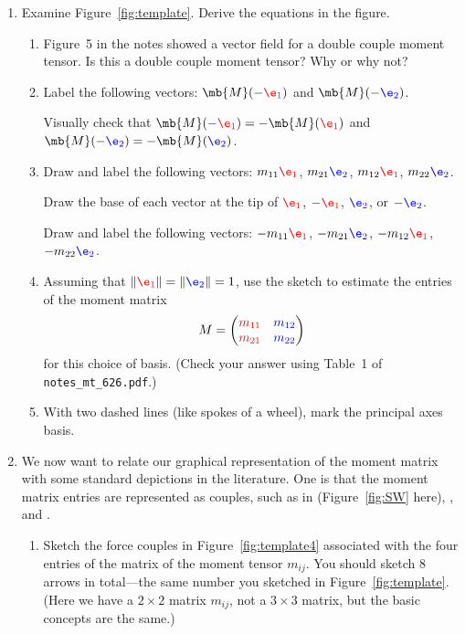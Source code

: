 \documentclass[11pt,titlepage,fleqn]{article}
\newcommand{\mtfile}{\texttt{notes\_mt\_626.pdf}}
\newcommand{\eone}{\textcolor{red}{\e_1}}
\newcommand{\etwo}{\textcolor{blue}{\e_2}}
\begin{document}
\begin{enumerate}

\item Examine Figure~\ref{fig:template}. Derive the equations in the figure.
\label{prob:bigvec}

\begin{enumerate}
\item Figure~5 in the notes showed a vector field for a double couple moment tensor. Is this a double couple moment tensor? Why or why not?

\item Label the following vectors: $\mb{M}(-\eone)$ and $\mb{M}(-\etwo)$.

Visually check that $\mb{M}(-\eone) = -\mb{M}(\eone)$ and $\mb{M}(-\etwo) = -\mb{M}(\etwo)$.

\item Draw and label the following vectors: $m_{11}\eone$, $m_{21}\etwo$, $m_{12}\eone$, $m_{22}\etwo$.

Draw the base of each vector at the tip of $\eone$, $-\eone$, $\etwo$, or $-\etwo$.

Draw and label the following vectors: $-m_{11}\eone$, $-m_{21}\etwo$, $-m_{12}\eone$, $-m_{22}\etwo$.

\item Assuming that $\|\eone\| = \|\etwo\| = 1$, use the sketch to estimate the entries of the moment matrix
%
\begin{equation*}
M = \begin{pmatrix} \textcolor{red}{m_{11}} & \textcolor{blue}{m_{12}} \\ \textcolor{red}{m_{21}} & \textcolor{blue}{m_{22}} \end{pmatrix}
\end{equation*}
%
for this choice of basis.
(Check your answer using Table~1 of \mtfile.)

\item With two dashed lines (like spokes of a wheel), mark the principal axes basis.

\end{enumerate}


\item 
\label{prob:matrix}
We now want to relate our graphical representation of the moment matrix with some standard depictions in the literature. One is that the moment matrix entries are represented as couples, such as in \citet[][Figure 4.4-4]{SteinWysession} (Figure~\ref{fig:SW} here), \citet[][Figure~9.2]{ShearerE2}, and \citet[][Figure 3.7]{AkiRichardsE2}.
%
\begin{enumerate}
\item Sketch the force couples in Figure~\ref{fig:template4} associated with the four entries of the matrix of the moment tensor $m_{ij}$. You should sketch 8 arrows in total---the same number you sketched in Figure~\ref{fig:template}.
(Here we have a $2 \times 2$ matrix $m_{ij}$, not a $3 \times 3$ matrix, but the basic concepts are the same.)


\end{enumerate}
\end{enumerate}
\end{document}
